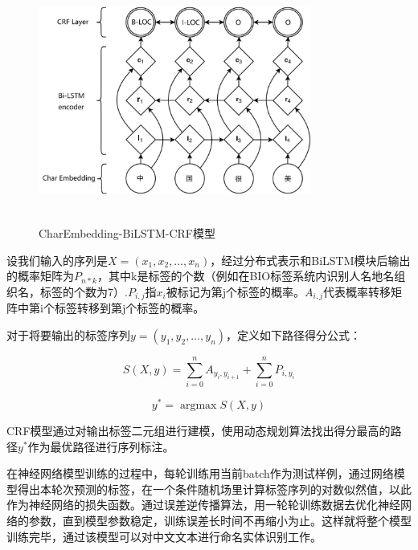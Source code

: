 \documentclass[winfonts,master,oneside,nobackinfo]{njuthesis}
\begin{document}
\begin{figure}[ht]
\centering
\begin{minipage}[t]{\textwidth}
\includegraphics[width=0.8\textwidth,height=8cm]{./figure/CE-LSTM-CRF.jpg}
\caption{CharEmbedding-BiLSTM-CRF模型}
\label{lab:1}
\end{minipage}
\end{figure}

设我们输入的序列是$X=\left(x_{1}, x_{2}, \ldots, x_{n}\right)$，经过分布式表示和BiLSTM模块后输出的概率矩阵为$P_{n * k}$，其中k是标签的个数（例如在BIO标签系统内识别人名地名组织名，标签的个数为7）.$P_{i, j}$指$x_{i}$被标记为第j个标签的概率。$A_{i, j}$代表概率转移矩阵中第i个标签转移到第j个标签的概率。

对于将要输出的标签序列$y=\left(y_{1}, y_{2}, \ldots, y_{n}\right)$，定义如下路径得分公式：

\begin{equation}
S(X, y)=\sum_{i=0}^{n} A_{y_{i}, y_{i+1}}+\sum_{i=0}^{n} P_{i, y_{i}} 
\end{equation}

\begin{equation}
y^{*}=\operatorname{argmax} S(X, y)
\end{equation}

CRF模型通过对输出标签二元组进行建模，使用动态规划算法找出得分最高的路径$y^{*}$作为最优路径进行序列标注。

在神经网络模型训练的过程中，每轮训练用当前batch作为测试样例，通过网络模型得出本轮次预测的标签，在一个条件随机场里计算标签序列的对数似然值，以此作为神经网络的损失函数。通过误差逆传播算法，用一轮轮训练数据去优化神经网络的参数，直到模型参数稳定，训练误差长时间不再缩小为止。这样就将整个模型训练完毕，通过该模型可以对中文文本进行命名实体识别工作。
\end{document}
